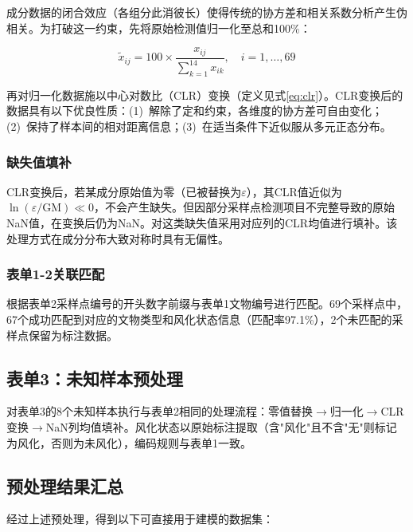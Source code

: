 \documentclass[12pt,a4paper]{ctexart}
\begin{document}
成分数据的闭合效应（各组分此消彼长）使得传统的协方差和相关系数分析产生伪相关\cite{2}。为打破这一约束，先将原始检测值归一化至总和100\%：

\begin{equation}
    \tilde{x}_{ij} = 100 \times \frac{x_{ij}}{\sum_{k=1}^{14} x_{ik}}, \quad i=1,\ldots,69
    \label{eq:normalize}
\end{equation}

再对归一化数据施以中心对数比（CLR）变换（定义见式\ref{eq:clr}）。CLR变换后的数据具有以下优良性质：(1)~解除了定和约束，各维度的协方差可自由变化；(2)~保持了样本间的相对距离信息；(3)~在适当条件下近似服从多元正态分布。

\subsubsection{缺失值填补}

CLR变换后，若某成分原始值为零（已被替换为$\varepsilon$），其CLR值近似为$\ln(\varepsilon/\text{GM})\ll0$，不会产生缺失。但因部分采样点检测项目不完整导致的原始NaN值，在变换后仍为NaN。对这类缺失值采用对应列的CLR均值进行填补。该处理方式在成分分布大致对称时具有无偏性。

\subsubsection{表单1-2关联匹配}

根据表单2采样点编号的开头数字前缀与表单1文物编号进行匹配。69个采样点中，67个成功匹配到对应的文物类型和风化状态信息（匹配率97.1\%），2个未匹配的采样点保留为标注数据。

\subsection{表单3：未知样本预处理}

对表单3的8个未知样本执行与表单2相同的处理流程：零值替换$\rightarrow$归一化$\rightarrow$CLR变换$\rightarrow$NaN列均值填补。风化状态以原始标注提取（含"风化"且不含"无"则标记为风化，否则为未风化），编码规则与表单1一致。

\subsection{预处理结果汇总}

经过上述预处理，得到以下可直接用于建模的数据集：
\end{document}
